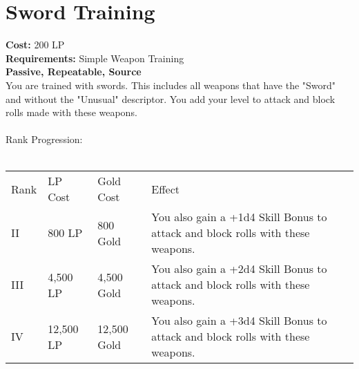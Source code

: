 \section{Sword Training}\label{perk:swordTraining}
\textbf{Cost:} 200 LP\\
\textbf{Requirements:} Simple Weapon Training\\
\textbf{Passive, Repeatable, Source}\\
You are trained with swords.
This includes all weapons that have the "Sword" and without the "Unusual" descriptor.
You add your level to attack and block rolls made with these weapons.\\
\\
Rank Progression:\\
\\
\begin{longtable}{l | l | l | p{9cm}}
	Rank & LP Cost & Gold Cost & Effect\\
	II & 800 LP & 800 Gold & You also gain a +1d4 Skill Bonus to attack and block rolls with these weapons.\\
	III & 4,500 LP & 4,500 Gold & You also gain a +2d4 Skill Bonus to attack and block rolls with these weapons.\\
	IV & 12,500 LP & 12,500 Gold & You also gain a +3d4 Skill Bonus to attack and block rolls with these weapons.\\
\end{longtable}